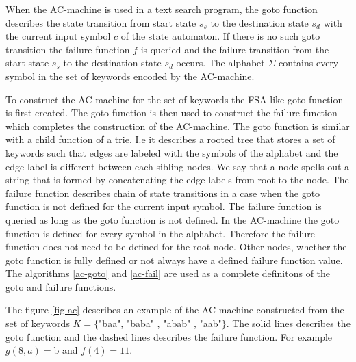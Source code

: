 \documentclass[english,twoside,censored,csm,algorithms-track-2020]{HYthesisML}
\theoremstyle{plain}
\theoremstyle{definition}
\begin{document}
  When the AC-machine is used in a text search program,
  the goto function describes the state transition from start state $s_s$ to the destination state
  $s_d$ with the current input symbol $c$ of the state automaton. If there is no such goto transition
  the failure function $f$ is queried and the failure transition from the start state $s_s$ to
  the destination state $s_d$ occurs. The alphabet $\Sigma$ contains every symbol in the set of
  keywords encoded by the AC-machine.

  To construct the AC-machine for the set of keywords the \textsc{FSA} like goto function is first
  created. The goto function is then used to construct the failure function which completes the
  construction of the AC-machine. The goto function is similar with a child function of a trie.
  I.e it describes a rooted tree that stores a set of keywords such that edges are labeled with the
  symbols of the alphabet and the edge label is different between each sibling nodes. We say that a node
  spells out a string that is formed by concatenating the edge labels from root to the node.
  The failure function describes chain of state transitions in a case when the goto function is not defined
  for the current input symbol. The failure function is queried as long as the goto function is not defined.
  In the AC-machine the goto function is defined for every symbol in the alphabet. Therefore the
  failure function does not need to be defined for the root node. Other nodes, whether the
  goto function is fully defined or not always have a defined failure function value.
  The algorithms \ref{ac-goto} and \ref{ac-fail} are used as a complete definitons of the goto and
  failure functions. 

  The figure \ref{fig-ac} describes an example of the AC-machine constructed from the set of
  keywords $K=\{$"baa", "baba" , "abab" , "aab"$\}$. The solid lines describes the goto function
  and the dashed lines describes the failure function. For example $g(8, a) = $b and $f(4)=11$.

\end{document}
